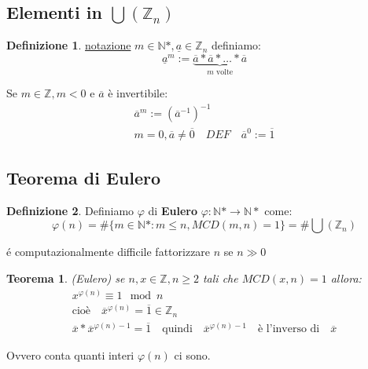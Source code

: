 \documentclass{article}
\newtheorem{theorem}{Teorema}[section]
\theoremstyle{definition}
\newtheorem{definition}{Definizione}[section]
\begin{document}
\subsection{Elementi in $ \bigcup(\mathbb{Z}_n) $}
\begin{definition}
        \underline{notazione} $m \in \mathbb{N}*, \underline{a} \in \mathbb{Z}_n$ definiamo:
        \begin{equation*}
                \underline{a}^m := \underbrace{\overline{a} * \overline{a} * \ldots * \overline{a}}_{\mbox{$m$ volte}}
        \end{equation*}

        Se $m \in \mathbb{Z}, m < 0$ e $\overline{a}$ è invertibile:
        \begin{align*}
                \overline{a}^m := {(\overline{a}^{-1})}^{-1} \\
                m = 0, \overline{a} \not = \overline{0} \quad DEF \quad \overline{a}^0 := \overline{1}
        \end{align*}
\end{definition}



\subsection{Teorema di Eulero}\label{sec:teorema_di_eulero}
\begin{definition}
        Definiamo $\varphi$ di \textbf{Eulero} $\varphi : \mathbb{N}* \to \mathbb{N}*$ come:
        \begin{equation*}
                \varphi(n) = \# \{m \in \mathbb{N}* : m \le n, MCD(m,n)=1\} = \#\bigcup(\mathbb{Z}_n)
        \end{equation*}
\end{definition}

é computazionalmente difficile fattorizzare $n$ se $n \gg 0$


\begin{theorem}
        (Eulero) se $n,x \in \mathbb{Z}, n \ge 2$ tali che $ MCD(x,n) = 1 $ allora:
        \begin{align*}
                x^{\varphi(n)} \equiv 1 \mod n \\
                \mbox{cioè} \quad \overline{x}^{\varphi(n)} = \overline{1} \in \mathbb{Z}_n \\
                \overline{x} * \overline{x}^{\varphi(n)-1} = \overline{1} \quad \mbox{quindi} \quad \overline{x}^{\varphi(n)-1} \quad \mbox{è l'inverso di} \quad \overline{x}
        \end{align*}
\end{theorem}
Ovvero conta quanti interi $\varphi(n)$ ci sono.
\end{document}
